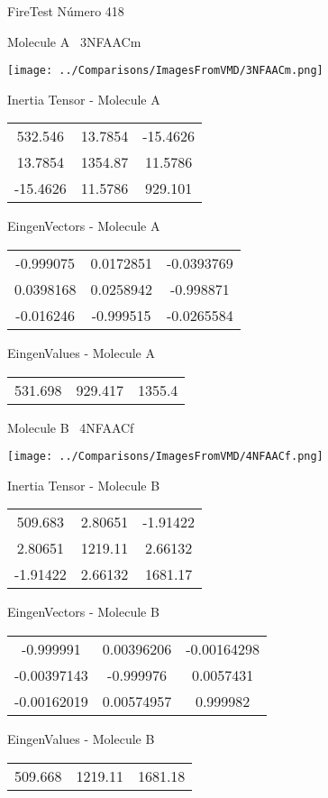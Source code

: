\vtab[-3cm]
\begin{center}
{\large FireTest \tab Número 418}
\end{center}
\begin{multicols}{2}
\begin{center}

Molecule A \
3NFAACm

\texttt{[image: ../Comparisons/ImagesFromVMD/3NFAACm.png]}

Inertia Tensor - Molecule A \\
\begin{tabular}{|c c c|}
532.546	 & 	13.7854	 & 	-15.4626	 \\
13.7854	 & 	1354.87	 & 	11.5786	 \\
-15.4626	 & 	11.5786	 & 	929.101
\end{tabular}

\vtab
 EingenVectors - Molecule A     \\
\begin{tabular}{|c c c|}
-0.999075	 & 	0.0172851	 & 	-0.0393769	 \\
0.0398168	 & 	0.0258942	 & 	-0.998871	 \\
-0.016246	 & 	-0.999515	 & 	-0.0265584
\end{tabular}

\vtab
 EingenValues - Molecule A     \\
\begin{tabular}{|c c c|}
531.698	 & 	929.417	 & 	1355.4	 \\
\end{tabular}
\columnbreak

Molecule B \
4NFAACf

\texttt{[image: ../Comparisons/ImagesFromVMD/4NFAACf.png]}

Inertia Tensor - Molecule B \\
\begin{tabular}{|c c c|}
509.683	 & 	2.80651	 & 	-1.91422	 \\
2.80651	 & 	1219.11	 & 	2.66132	 \\
-1.91422	 & 	2.66132	 & 	1681.17
\end{tabular}

\vtab
 EingenVectors - Molecule B     \\
\begin{tabular}{|c c c|}
-0.999991	 & 	0.00396206	 & 	-0.00164298	 \\
-0.00397143	 & 	-0.999976	 & 	0.0057431	 \\
-0.00162019	 & 	0.00574957	 & 	0.999982
\end{tabular}

\vtab
 EingenValues - Molecule B     \\
\begin{tabular}{|c c c|}
509.668	 & 	1219.11	 & 	1681.18	 \\
\end{tabular}

\end{center}
\end{multicols}

